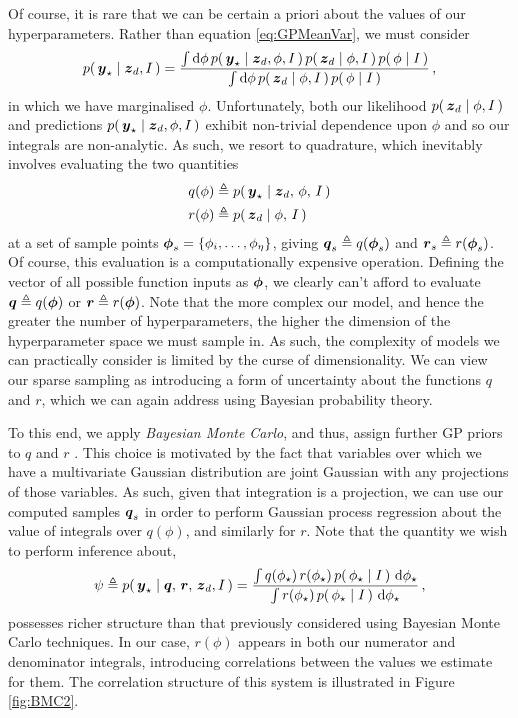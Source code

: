 \documentclass{acmtrans2m}
\begin{document}
\noindent Of course, it is rare that we can be certain a priori about the values of our hyperparameters. Rather than equation \eqref{eq:GPMeanVar}, we must consider
\begin{equation} \label{eq:Marginalising}
 p\!\left(\,\boldsymbol{y}_\star\mid\boldsymbol{z}_d,I\,\right)=\frac{\int\mathrm{d}\phi\, p\!\left(\,\boldsymbol{y}_\star\mid\boldsymbol{z}_d,\phi,I\,\right)p\!\left(\,\boldsymbol{z}_d\mid\phi,I\,\right)p\!\left(\,\phi\mid I\,\right)}
{\int\mathrm{d}\phi\, p\!\left(\,\boldsymbol{z}_d\mid\phi,I\,\right)p\!\left(\,\phi\mid I\,\right)}\,,
\end{equation}
in which we have marginalised $\phi$. Unfortunately, both our likelihood $p\!\left(\,\boldsymbol{z}_d\mid\phi,I\,\right)$ and predictions $p\!\left(\,\boldsymbol{y}_\star\mid\boldsymbol{z}_d,\phi,I\,\right)$ exhibit non-trivial dependence upon $\phi$ and so our integrals are non-analytic. As such, we resort to quadrature, which inevitably involves evaluating the two quantities
\begin{equation}
\begin{split}
q(\phi)& \triangleq p\!\left(\,\boldsymbol{y}_\star\mid\boldsymbol{z}_d,\,\phi,\,I\,\right) \\
r(\phi)& \triangleq p\!\left(\,\boldsymbol{z}_d\mid\phi,\,I\,\right)
\end{split}
\end{equation}
at a set of sample points $\boldsymbol{\phi}_s=\{\phi_i,\ldots,\phi_\eta\}$, giving $\boldsymbol{q}_s\triangleq q(\boldsymbol{\phi}_s)$ and $\boldsymbol{r}_s\triangleq r(\boldsymbol{\phi}_s)$. Of course, this evaluation is a computationally expensive operation. Defining the vector of all possible function inputs as $\boldsymbol{\phi}$, we clearly can't afford to evaluate $\boldsymbol{q}\triangleq q(\boldsymbol{\phi})$ or $\boldsymbol{r}\triangleq r(\boldsymbol{\phi})$. Note that the more complex our model, and hence the greater the number of hyperparameters, the higher the dimension of the hyperparameter space we must sample in. As such, the complexity of models we can practically consider is limited by the curse of dimensionality. We can view our sparse sampling as introducing a form of uncertainty about the functions $q$ and $r$, which we can again address using Bayesian probability theory. 

To this end, we apply \emph{Bayesian Monte Carlo}, and thus, assign further GP priors to $q$ and $r$ \cite{BZMonteCarlo}. This choice is motivated by the fact that variables over which we have a multivariate Gaussian distribution are joint Gaussian with any projections of those variables. As such, given that integration is a projection, we can use our computed samples $\boldsymbol{q}_s$ in order to perform Gaussian process regression about the value of integrals over $q(\phi)$, and similarly for $r$. Note that the quantity we wish to perform inference about, 
\begin{equation}
 \psi\triangleq p\!\left(\,\boldsymbol{y}_\star\mid\boldsymbol{q},\,\boldsymbol{r},\,\boldsymbol{z}_d,I\,\right)= \frac{\int q(\phi_\star)\,r(\phi_\star)\,p\!\left(\,\phi_\star\mid I\,\right)\,\mathrm{d}\phi_\star}
{\int r(\phi_\star)\,p\!\left(\,\phi_\star\mid I\,\right)\,\mathrm{d}\phi_\star}\,,
\end{equation} 
possesses richer structure than that previously considered using Bayesian Monte Carlo techniques. In our case, $r(\phi)$ appears in both our numerator and denominator integrals, introducing correlations between the values we estimate for them. The correlation structure of this system is illustrated in Figure \ref{fig:BMC2}. 
\end{document}
